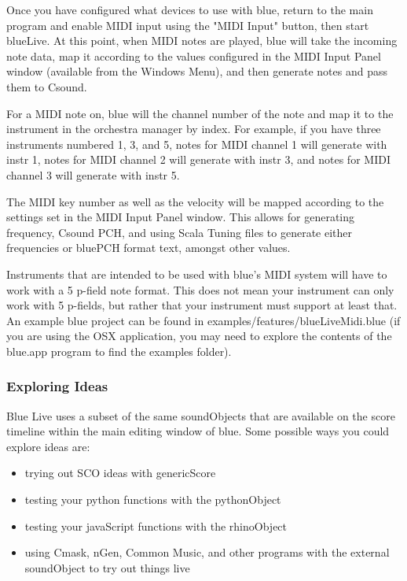 Once you have configured what devices to use with blue, return to the
main program and enable MIDI input using the "MIDI Input" button, then
start blueLive. At this point, when MIDI notes are played, blue will
take the incoming note data, map it according to the values configured
in the MIDI Input Panel window (available from the Windows Menu), and
then generate notes and pass them to Csound.

For a MIDI note on, blue will the channel number of the note and map it
to the instrument in the orchestra manager by index. For example, if you
have three instruments numbered 1, 3, and 5, notes for MIDI channel 1
will generate with instr 1, notes for MIDI channel 2 will generate with
instr 3, and notes for MIDI channel 3 will generate with instr 5.

The MIDI key number as well as the velocity will be mapped according to
the settings set in the MIDI Input Panel window. This allows for
generating frequency, Csound PCH, and using Scala Tuning files to
generate either frequencies or bluePCH format text, amongst other
values.

Instruments that are intended to be used with blue's MIDI system will
have to work with a 5 p-field note format. This does not mean your
instrument can only work with 5 p-fields, but rather that your
instrument must support at least that. An example blue project can be
found in examples/features/blueLiveMidi.blue (if you are using the OSX
application, you may need to explore the contents of the blue.app
program to find the examples folder).

\subsubsection{Exploring Ideas}

Blue Live uses a subset of the same soundObjects that are available on
the score timeline within the main editing window of blue. Some possible
ways you could explore ideas are:

\begin{itemize}
\item
  trying out SCO ideas with genericScore
\item
  testing your python functions with the pythonObject
\item
  testing your javaScript functions with the rhinoObject
\item
  using Cmask, nGen, Common Music, and other programs with the external
  soundObject to try out things live
\end{itemize}

